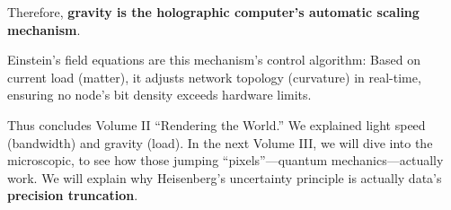 Therefore, \textbf{gravity is the holographic computer's automatic scaling mechanism}.

Einstein's field equations are this mechanism's control algorithm: Based on current load (matter), it adjusts network topology (curvature) in real-time, ensuring no node's bit density exceeds hardware limits.

Thus concludes Volume II ``Rendering the World.'' We explained light speed (bandwidth) and gravity (load).
In the next Volume III, we will dive into the microscopic, to see how those jumping ``pixels''---quantum mechanics---actually work. We will explain why Heisenberg's uncertainty principle is actually data's \textbf{precision truncation}.
